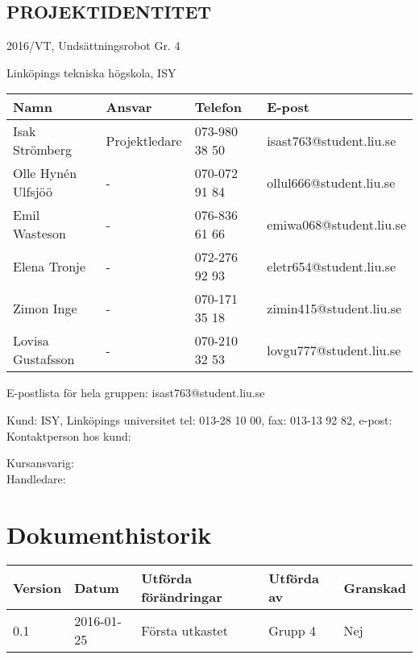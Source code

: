 \documentclass[11pt]{article}
\begin{document}
\pagebreak
\begin{center}

\section*{PROJEKTIDENTITET}
2016/VT, Undsättningsrobot Gr. 4

Linköpings tekniska högskola, ISY
\vspace{5em}
\begin{center}

\begin{tabular}{|l|l|l|l|} \hline
\textbf{Namn} & \textbf{Ansvar} & \textbf{Telefon} & \textbf{E-post}  \\ \hline 
Isak Strömberg & Projektledare & 073-980 38 50 & isast763@student.liu.se \\ \hline
Olle Hynén Ulfsjöö & - & 070-072 91 84 & ollul666@student.liu.se \\ \hline
Emil Wasteson & - & 076-836 61 66 & emiwa068@student.liu.se \\ \hline
Elena Tronje & - & 072-276 92 93 & eletr654@student.liu.se \\ \hline
Zimon Inge & - & 070-171 35 18 & zimin415@student.liu.se \\ \hline
Lovisa Gustafsson & - & 070-210 32 53 & lovgu777@student.liu.se \\ \hline
\end{tabular}

\end{center}

E-postlista för hela gruppen: isast763@student.liu.se

\vspace{5em}
Kund: ISY, Linköpings universitet
tel: 013-28 10 00, fax: 013-13 92 82, e-post: 
Kontaktperson hos kund:

\vspace{5em}
Kursansvarig:  \\
Handledare: 
\end{center}
\pagebreak

\tableofcontents

\pagebreak

\section*{Dokumenthistorik}
\begin{table}[h]
\begin{tabular}{|l|l|l|l|l|} \hline

\textbf{Version} & \textbf{Datum} & \textbf{Utförda förändringar} & \textbf{Utförda av} & \textbf{Granskad} \\ \hline
0.1 & 2016-01-25 &  Första utkastet & Grupp 4 & Nej \\ \hline
\end{tabular}
\end{table}
\end{document}
